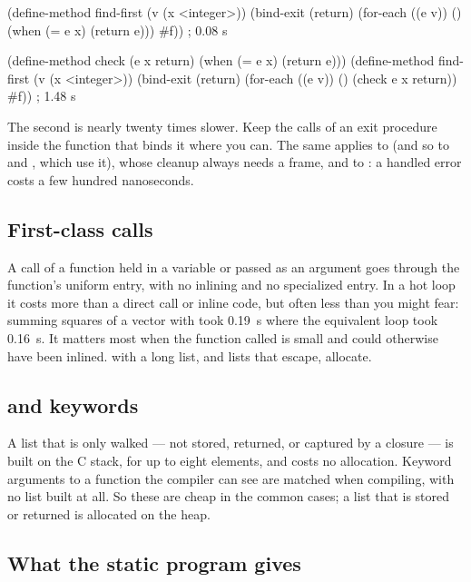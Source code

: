 \begin{dylan}
(define-method find-first (v (x <integer>))
  (bind-exit (return)
    (for-each ((e v)) ()
      (when (= e x) (return e)))
    #f))                                              ; 0.08 s

(define-method check (e x return) (when (= e x) (return e)))
(define-method find-first (v (x <integer>))
  (bind-exit (return)
    (for-each ((e v)) ()
      (check e x return))
    #f))                                              ; 1.48 s
\end{dylan}

The second is nearly twenty times slower. Keep the calls of an exit
procedure inside the function that binds it where you can. The same
applies to  (and so to  and
, which use it), whose cleanup always needs a frame,
and to : a handled error costs a few hundred
nanoseconds.

\subsection{First-class calls}

A call of a function held in a variable or passed as an argument goes
through the function's uniform entry, with no inlining and no
specialized entry. In a hot loop it costs more than a direct call or
inline code, but often less than you might fear: summing squares of a
vector with  took
0.19~s where the equivalent  loop took 0.16~s. It matters
most when the function called is small and could otherwise have been
inlined.  with a long list, and  lists that
escape, allocate.

\subsection{ and keywords}

A  list that is only walked --- not stored, returned, or
captured by a closure --- is built on the C stack, for up to eight
elements, and costs no allocation. Keyword arguments to a function the
compiler can see are matched when compiling, with no list built at all.
So these are cheap in the common cases; a  list that is
stored or returned is allocated on the heap.

\subsection{What the static program gives}

